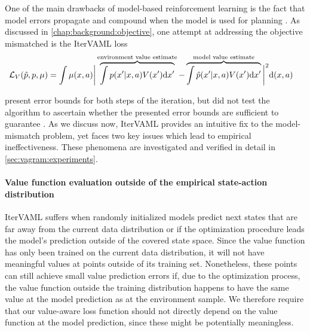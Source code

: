 One of the main drawbacks of model-based reinforcement learning is the fact that model errors propagate and compound when the model is used for planning \parencite{schneider1997exploiting,kearns2002near,talvitie2017self}.
As discussed in \autoref{chap:background:objective}, one attempt at addressing the objective mismatched is the IterVAML loss \parencite{itervaml}
\begin{align}
    &\mathcal{L}_V(\hat{p}, p, \mu) = \int \mu(x,a) \bigg|\overbrace{\int p(x'|x,a)V(x')\mathrm{d}x'}^{\text{environment value estimate}}  - \overbrace{\int \hat{p}(x'|x,a) V(x') \mathrm{d}x'}^{\text{model value estimate}}\bigg|^2 \mathrm{d} (x,a)
\end{align}

\textcite{itervaml} present error bounds for both steps of the iteration, but did not test the algorithm to ascertain whether the presented error bounds are sufficient to guarantee . 
As we discuss now, IterVAML provides an intuitive fix to the model-mismatch problem, yet faces two key issues which lead to empirical ineffectiveness.  
These phenomena are investigated and verified in detail in \autoref{sec:vagram:experiments}.


\paragraph{Value function evaluation outside of the empirical state-action distribution} IterVAML suffers when randomly initialized models predict next states that are far away from the current data distribution or if the optimization procedure leads the model's prediction outside of the covered state space. 
Since the value function has only been trained on the current data distribution, it will not have meaningful values at points outside of its training set.
Nonetheless, these points can still achieve small value prediction errors if, due to the optimization process, the value function outside the training distribution happens to have the same value at the model prediction as at the environment sample.
We therefore require that our value-aware loss function should not directly depend on the value function at the model prediction, since these might be potentially meaningless.

